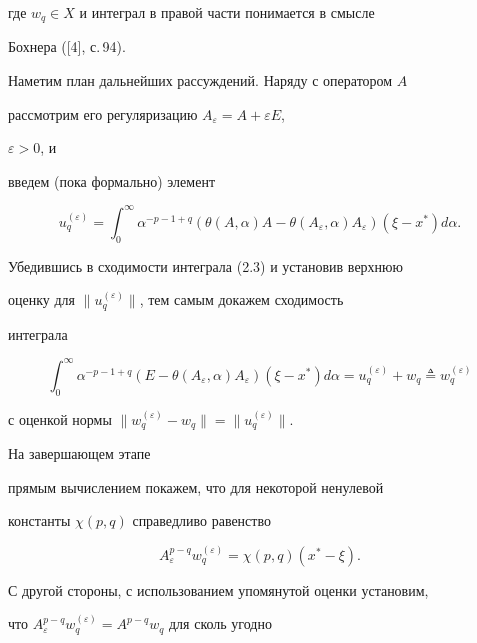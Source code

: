 где $w_q\in X$ и интеграл в правой части понимается в смысле 


Бохнера ([4], с.\,94).





Наметим план дальнейших рассуждений. Наряду с оператором $A$ 


рассмотрим его регуляризацию $A_\varepsilon=A+\varepsilon E$, 


$\varepsilon>0$, и


введем (пока формально) элемент


\begin{equation}


u^{(\varepsilon)}_q=\int^\infty_0 \alpha^{-p-1+q}(\theta(A,\alpha)


A-\theta(A_\varepsilon,\alpha)A_\varepsilon)


(\xi-x^*)d\alpha.


\end{equation}


Убедившись в сходимости интеграла (2.3) и установив верхнюю 


оценку для $\|u^{(\varepsilon)}_q\|$, тем самым докажем сходимость 


интеграла


\begin{equation}


\int^\infty_0 \alpha^{-p-1+q}(E-\theta(A_\varepsilon,\alpha)


A_\varepsilon)(\xi-x^*)d\alpha=u^{(\varepsilon)}_q+


w_q\triangleq w^{(\varepsilon)}_q


\end{equation}


с оценкой нормы $\|w^{(\varepsilon)}_q-w_q\|= \|u^{(\varepsilon)}_q\|$. 


На завершающем этапе


прямым вычислением покажем, что для некоторой ненулевой 


константы $\chi(p,q)$ справедливо равенство


$$


A^{p-q}_\varepsilon w^{(\varepsilon)}_q=


\chi(p,q)(x^*-\xi).


$$


С другой стороны, с использованием упомянутой оценки установим, 


что $A^{p-q}_\varepsilon w^{(\varepsilon)}_q=A^{p-q}w_q$ для сколь угодно 


